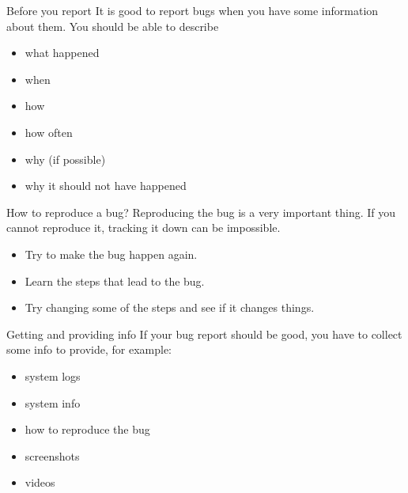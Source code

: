\documentclass[12pt]{beamer}
\begin{document}
\begin{frame}{Before you report}
It is good to report bugs when you have some information about them. You should be able to describe

\begin{itemize}
	\item what happened
	\item when 
	\item how 
	\item how often
	\item why (if possible)
	\item why it should not have happened
\end{itemize}	
\end{frame}

\begin{frame}{How to reproduce a bug?}
	Reproducing the bug is a very important thing. If you cannot reproduce it, tracking it down can be impossible.
	\begin{itemize}
		\item Try to make the bug happen again.
		\item Learn the steps that lead to the bug.
		\item Try changing some of the steps and see if it changes things.
	\end{itemize}
\end{frame}

\begin{frame}{Getting and providing info}
If your bug report should be good, you have to collect some info to provide, for example:
\begin{itemize}
	\item system logs
	\item system info
	\item how to reproduce the bug
	\item screenshots
	\item videos
\end{itemize}
\end{frame}
\end{document}
